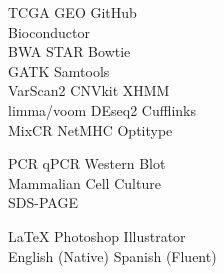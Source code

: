 \begin{minipage}[t]{0.33\textwidth}
TCGA \textbullet{} GEO \textbullet{} GitHub \\
Bioconductor \\

BWA \textbullet{} STAR \textbullet{} Bowtie \\

GATK \textbullet{} Samtools \\
VarScan2 \textbullet{} CNVkit \textbullet{} XHMM \\

limma/voom \textbullet{} DEseq2 \textbullet{} Cufflinks \\

MixCR\textbullet{} NetMHC \textbullet{} Optitype \\
\sectionspace %

PCR \textbullet{} qPCR \textbullet{} Western Blot \\
Mammalian Cell Culture \\
SDS-PAGE \\
\sectionspace %

\LaTeX \textbullet{} Photoshop \textbullet{} Illustrator\\
English (Native) \textbullet{} Spanish (Fluent) \\ 



\sectionspace %

\end{minipage} %
\hfill
%
%

